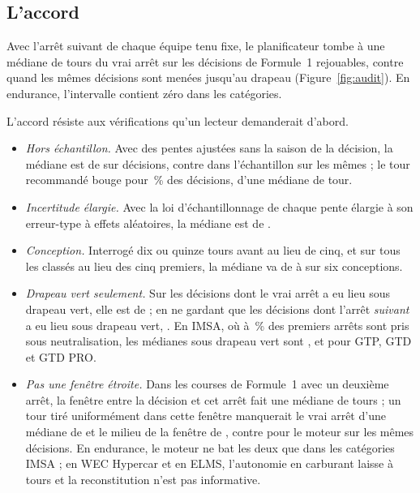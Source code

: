 \documentclass[11pt,a4paper]{article}
\begin{document}
\subsection{L'accord}
\label{sec:committed}

Avec l'arrêt suivant de chaque équipe tenu fixe, le planificateur tombe à une
médiane de \CommitAllAfter{} tours \CommitAllCi{} du vrai arrêt sur les
\NCommitAll{} décisions de Formule~1 rejouables, contre \CommitAllBefore{} quand
les mêmes décisions sont menées jusqu'au drapeau (Figure~\ref{fig:audit}). En
endurance, l'intervalle contient zéro dans les \NEndCommitContainsZero{}
catégories.

L'accord résiste aux vérifications qu'un lecteur demanderait d'abord.
\begin{itemize}
\item \emph{Hors échantillon.} Avec des pentes ajustées sans la saison de la
décision, la médiane est de \OosMedian{} \OosCi{} sur \OosN{} décisions, contre
\OosPublished{} dans l'échantillon sur les mêmes ; le tour recommandé bouge pour
\OosMoved{}\,\% des décisions, d'une médiane de \OosShift{} tour.
\item \emph{Incertitude élargie.} Avec la loi d'échantillonnage de chaque pente
élargie à son erreur-type à effets aléatoires, la médiane est de \WideMedian{}
\WideCi{}.
\item \emph{Conception.} Interrogé dix ou quinze tours avant au lieu de cinq, et
sur tous les classés au lieu des cinq premiers, la médiane va de
\DesignMinMedian{} à \DesignMaxMedian{} sur six conceptions.
\item \emph{Drapeau vert seulement.} Sur les \FoneGreenN{} décisions dont le vrai
arrêt a eu lieu sous drapeau vert, elle est de \FoneGreenMedian{}
\FoneGreenCi{} ; en ne gardant que les décisions dont l'arrêt \emph{suivant} a
eu lieu sous drapeau vert, \CommitGreenAfter{} \CommitGreenCi{}. En IMSA, où
\ImsaCautionMin{} à \ImsaCautionMax{}\,\% des premiers arrêts sont pris sous
neutralisation, les médianes sous drapeau vert sont \ImsaGtpGreenMedian{},
\ImsaGtdGreenMedian{} et \ImsaGtdproGreenMedian{} pour GTP, GTD et GTD PRO.
\item \emph{Pas une fenêtre étroite.} Dans les courses de Formule~1 avec un
deuxième arrêt, la fenêtre entre la décision et cet arrêt fait une médiane de
\CommitWindow{} tours ; un tour tiré uniformément dans cette fenêtre manquerait
le vrai arrêt d'une médiane de \CommitUniformMiss{} et le milieu de la fenêtre
de \CommitMidpointMiss{}, contre \CommitEngineMiss{} pour le moteur sur les
mêmes décisions. En endurance, le moteur ne bat les deux que dans les
\NEndCommitInformative{} catégories IMSA ; en WEC Hypercar et en ELMS,
l'autonomie en carburant laisse \EndCommitWecHypercarWindow{} à
\EndCommitElmsLmptwoProAmWindow{} tours et la reconstitution n'est pas
informative.
\end{itemize}
\end{document}
